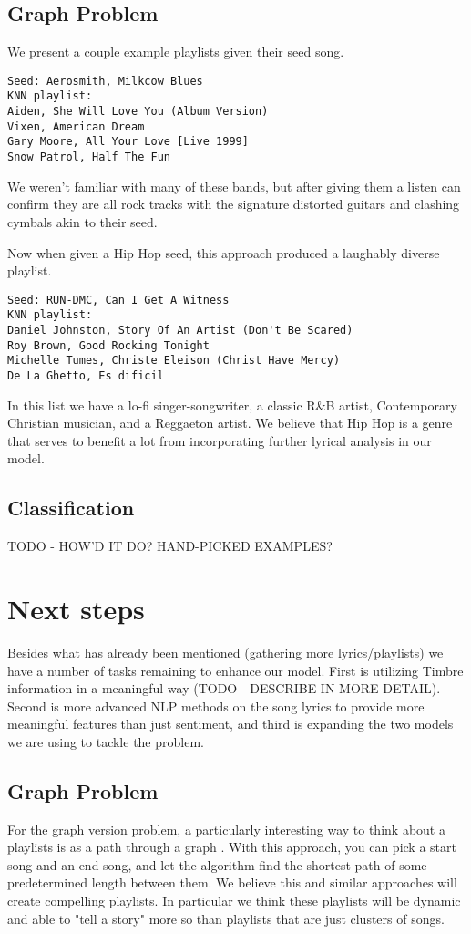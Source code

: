 \documentclass[10pt,journal,compsoc]{IEEEtran}
\begin{document}
\subsection{Graph Problem}
We present a couple example playlists given their seed song.
\begin{lstlisting}
Seed: Aerosmith, Milkcow Blues
KNN playlist:
Aiden, She Will Love You (Album Version)
Vixen, American Dream
Gary Moore, All Your Love [Live 1999]
Snow Patrol, Half The Fun
\end{lstlisting}
We weren't familiar with many of these bands, but after giving them a listen can confirm they are all rock tracks with the signature distorted guitars and clashing cymbals akin to their seed.

Now when given a Hip Hop seed, this approach produced a laughably diverse playlist.
\begin{lstlisting}
Seed: RUN-DMC, Can I Get A Witness
KNN playlist:
Daniel Johnston, Story Of An Artist (Don't Be Scared)
Roy Brown, Good Rocking Tonight
Michelle Tumes, Christe Eleison (Christ Have Mercy)
De La Ghetto, Es dificil
\end{lstlisting}
In this list we have a lo-fi singer-songwriter, a classic R\&B artist, Contemporary Christian musician, and a Reggaeton artist. We believe that Hip Hop is a genre that serves to benefit a lot from incorporating further lyrical analysis in our model.

\subsection{Classification}
TODO - HOW'D IT DO? HAND-PICKED EXAMPLES?

\section{Next steps}
Besides what has already been mentioned (gathering more lyrics/playlists) we have a number of tasks remaining to enhance our model. First is utilizing Timbre information in a meaningful way (TODO - DESCRIBE IN MORE DETAIL). Second is more advanced NLP methods on the song lyrics to provide more meaningful features than just sentiment, and third is expanding the two models we are using to tackle the problem.

\subsection{Graph Problem}
For the graph version problem, a particularly interesting way to think about a playlists is as a path through a graph \cite{Alghoniemy01anetwork}. With this approach, you can pick a start song and an end song, and let the algorithm find the shortest path of some predetermined length between them. We believe this and similar approaches will create compelling playlists. In particular we think these playlists will be dynamic and able to "tell a story" more so than playlists that are just clusters of songs.
\end{document}
